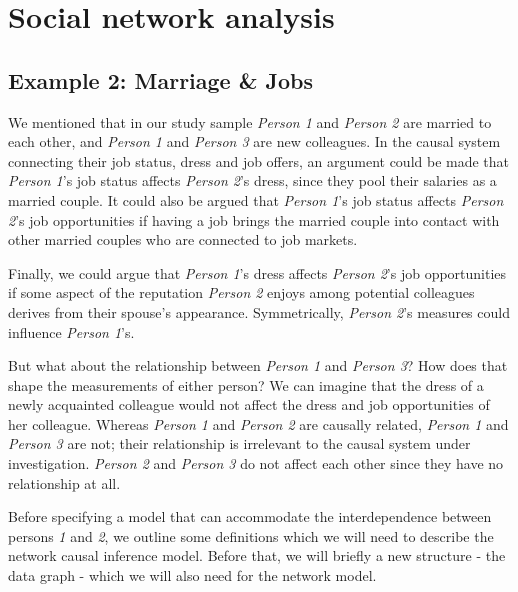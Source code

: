 \documentclass[
  letterpaper,
  DIV=11,
  numbers=noendperiod,
  oneside]{scrreprt}
\begin{document}
\hypertarget{sec-network-causal-inference}{%
\section{Social network analysis}\label{sec-network-causal-inference}}

\hypertarget{example-2-marriage-jobs}{%
\subsection*{Example 2: Marriage \&
Jobs}\label{example-2-marriage-jobs}}

We mentioned that in our study sample \emph{Person 1} and \emph{Person
2} are married to each other, and \emph{Person 1} and \emph{Person 3}
are new colleagues. In the causal system connecting their job status,
dress and job offers, an argument could be made that \emph{Person 1}'s
job status affects \emph{Person 2}'s dress, since they pool their
salaries as a married couple. It could also be argued that \emph{Person
1}'s job status affects \emph{Person 2}'s job opportunities if having a
job brings the married couple into contact with other married couples
who are connected to job markets.

Finally, we could argue that \emph{Person 1}'s dress affects
\emph{Person 2}'s job opportunities if some aspect of the reputation
\emph{Person 2} enjoys among potential colleagues derives from their
spouse's appearance. Symmetrically, \emph{Person 2}'s measures could
influence \emph{Person 1}'s.

But what about the relationship between \emph{Person 1} and \emph{Person
3}? How does that shape the measurements of either person? We can
imagine that the dress of a newly acquainted colleague would not affect
the dress and job opportunities of her colleague. Whereas \emph{Person
1} and \emph{Person 2} are causally related, \emph{Person 1} and
\emph{Person 3} are not; their relationship is irrelevant to the causal
system under investigation. \emph{Person 2} and \emph{Person 3} do not
affect each other since they have no relationship at all.

Before specifying a model that can accommodate the interdependence
between persons \emph{1} and \emph{2}, we outline some definitions which
we will need to describe the network causal inference model. Before
that, we will briefly a new structure - the data graph - which we will
also need for the network model.
\end{document}
